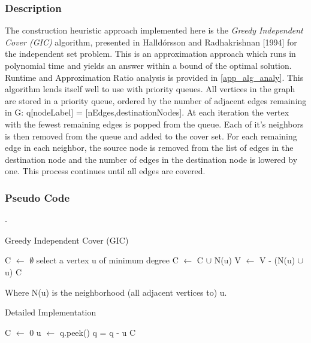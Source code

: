 \documentclass[acmlarge]{acmart}
\begin{document}
\subsubsection{Description}

The construction heuristic approach implemented here is the \textit{Greedy Independent Cover (GIC)} algorithm, presented in Halld\'{o}rsson and Radhakrishnan [1994] \cite{Hall97} for the independent set problem. This is an approximation approach which runs in polynomial time and yields an answer within a bound of the optimal solution. Runtime and Approximation Ratio analysis is provided in \ref{app_alg_analy}. This algorithm lends itself well to use with priority queues. All vertices in the graph are stored in a priority queue, ordered by the number of adjacent edges remaining in G: q[nodeLabel] = [nEdges,destinationNodes]. At each iteration the vertex with the fewest remaining edges is popped from the queue. Each of it's neighbors is then removed from the queue and added to the cover set. For each remaining edge in each neighbor, the source node is removed from the list of edges in the destination node and the number of edges in the destination node is lowered by one. This process continues until all edges are covered.

\subsubsection{Pseudo Code}

-\\

\begin{algorithm}[H]
	\caption{Greedy Independent Cover (GIC)}
	\SetAlgoLined
	C $\leftarrow$ $\emptyset$\;
	{
		select a vertex u of minimum degree\;
		C $\leftarrow$ C $\cup$ N(u)\;
		V $\leftarrow$ V - (N(u) $\cup$ {u})\;
	}
	\Return C\;
\end{algorithm}

Where N(u) is the neighborhood (all adjacent vertices to) u.\\

\begin{algorithm}[H]
	\caption{Detailed Implementation}
	\SetAlgoLined
	C $\leftarrow$ 0\;
	{
		u $\leftarrow$ q.peek()\;
		q = q - u\;
	}
	\Return C\;
\end{algorithm}
\end{document}

